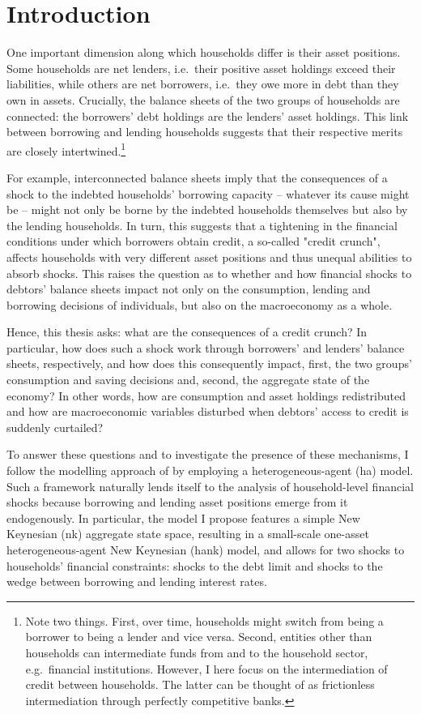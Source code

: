 \documentclass[12pt]{article} %
\numberwithin{equation}{section} %
\numberwithin{figure}{section}
\numberwithin{table}{section}
\begin{document}
\section{Introduction}
\label{sec:introduction}

One important dimension along which households differ is their asset positions. Some households are net lenders, i.e.~their positive asset holdings exceed their liabilities, while others are net borrowers, i.e.~they owe more in debt than they own in assets. Crucially, the balance sheets of the two groups of households are connected: the borrowers' debt holdings are the lenders' asset holdings. This link between borrowing and lending households suggests that their respective merits are closely intertwined.\footnote{Note two things. First, over time, households might switch from being a borrower to being a lender and vice versa. Second, entities other than households can intermediate funds from and to the household sector, e.g.~financial institutions. However, I here focus on the intermediation of credit between households. The latter can be thought of as frictionless intermediation through perfectly competitive banks.} 

For example, interconnected balance sheets imply that the consequences of a shock to the indebted households' borrowing capacity -- whatever its cause might be -- might not only be borne by the indebted households themselves but also by the lending households. In turn, this suggests that a tightening in the financial conditions under which borrowers obtain credit, a so-called "credit crunch", affects households with very different asset positions and thus unequal abilities to absorb shocks. This raises the question as to whether and how financial shocks to debtors' balance sheets impact not only on the consumption, lending and borrowing decisions of individuals, but also on the macroeconomy as a whole. 

Hence, this thesis asks: what are the consequences of a credit crunch? In particular, how does such a shock work through borrowers' and lenders' balance sheets, respectively, and how does this consequently impact, first, the two groups' consumption and saving decisions and, second, the aggregate state of the economy? In other words, how are consumption and asset holdings redistributed and how are macroeconomic variables disturbed when debtors' access to credit is suddenly curtailed?

To answer these questions and to investigate the presence of these mechanisms, I follow the modelling approach of \textcite{gl2017} by employing a heterogeneous-agent (\Gls{ha}) model. Such a framework naturally lends itself to the analysis of household-level financial shocks because borrowing and lending asset positions emerge from it endogenously. In particular, the model I propose features a simple New Keynesian (\Gls{nk}) aggregate state space, resulting in a small-scale one-asset heterogeneous-agent New Keynesian (\Gls{hank}) model, and allows for two shocks to households' financial constraints: shocks to the debt limit and shocks to the wedge between borrowing and lending interest rates.
\end{document}
